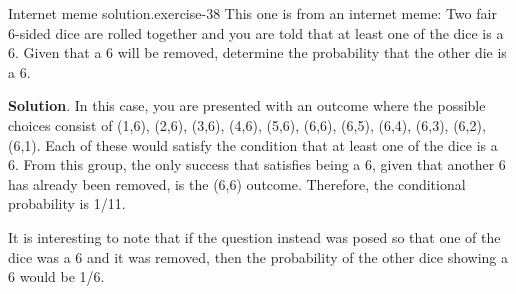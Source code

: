 \documentclass[10pt,]{book}
\numberwithin{equation}{section}
\begin{document}
\begin{inlineexercise}{Internet meme solution.}{exercise-38}%
\hypertarget{p-615}{}%
This one is from an internet meme:  Two fair 6-sided dice are rolled together and you are told that at least one of the dice is a 6. Given that a 6 will be removed, determine the probability that the other die is a 6.%
\par\smallskip%
\noindent\textbf{Solution}.\hypertarget{solution-16}{}\quad%
\hypertarget{p-616}{}%
In this case, you are presented with an outcome where the possible choices consist of (1,6), (2,6), (3,6), (4,6), (5,6), (6,6), (6,5), (6,4), (6,3), (6,2), (6,1).  Each of these would satisfy the condition that at least one of the dice is a 6. From this group, the only success that satisfies being a 6, given that another 6 has already been removed, is the (6,6) outcome. Therefore, the conditional probability is 1/11.%
\par
\hypertarget{p-617}{}%
It is interesting to note that if the question instead was posed so that one of the dice was a 6 and it was removed, then the probability of the other dice showing a 6 would be 1/6.%
\end{inlineexercise}
%
\par
\hypertarget{p-618}{}%
\end{document}
